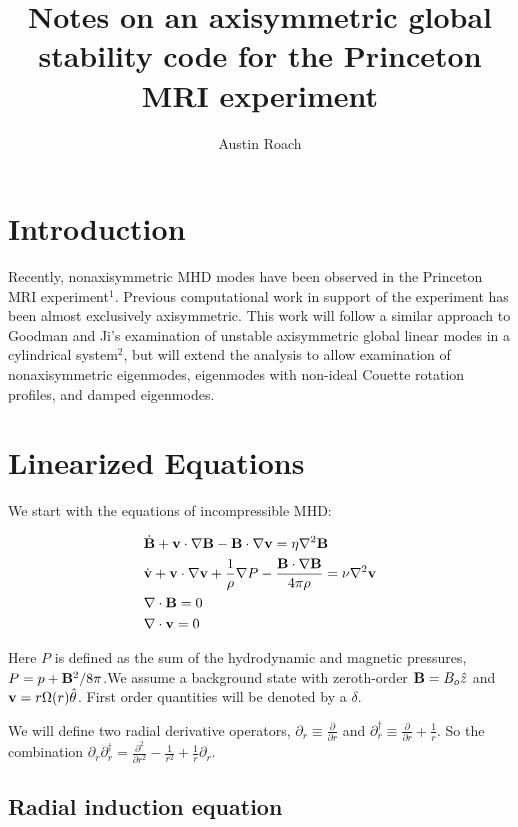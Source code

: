 \documentclass[letterpaper]{article}
\title{Notes on an axisymmetric global stability code for the Princeton MRI experiment}
\author{Austin Roach}
\begin{document}
\maketitle{}

\section{Introduction}

Recently, nonaxisymmetric MHD modes have been observed in the
Princeton MRI experiment$^1$.  Previous computational work in support
of the experiment has been almost exclusively axisymmetric.  This work
will follow a similar approach to Goodman and Ji's examination of
unstable axisymmetric global linear modes in a cylindrical system$^2$,
but will extend the analysis to allow examination of nonaxisymmetric
eigenmodes, eigenmodes with non-ideal Couette rotation profiles, and
damped eigenmodes.

\section{Linearized Equations}

We start with the equations of incompressible MHD:

\begin{align}
&\dot{{\bf B}} + {\bf v}\cdot\nabla{\bf B} - {\bf B}\cdot\nabla{\bf v}=\eta\nabla^2 {\bf B}
\\
&\dot{{\bf v}}+{\bf v}\cdot\nabla{\bf v}+\frac{1}{\rho}\nabla{P}-\frac{{\bf B}\cdot\nabla{\bf B}}{4\pi\rho}=\nu\nabla^2{\bf v}
\\
&\nabla\cdot{\bf B}=0
\\
&\nabla\cdot{\bf v}=0
\end{align}

Here $P$ is defined as the sum of the hydrodynamic and magnetic
pressures, $P=p+{\bf B}^2/8\pi$.We assume a background state with
zeroth-order ${\bf B}=B_o \hat{z}$ and ${\bf
  v}=r\Omega(r)\hat{\theta}$.  First order quantities will be denoted
by a $\delta$.

We will define two radial derivative operators, $\partial_r \equiv
\frac{\partial}{\partial r}$ and $\partial_{r}^\dagger \equiv
\frac{\partial}{\partial r}+\frac{1}{r}$.  So the combination
$\partial_r \partial_r^\dagger = \frac{\partial^2}{\partial
  r^2}-\frac{1}{r^2}+\frac{1}{r}\partial_r$.

\subsection{Radial induction equation}
\end{document}
